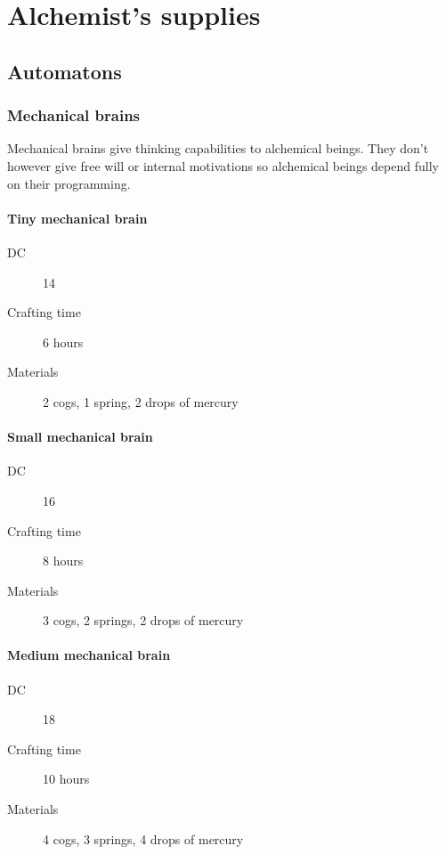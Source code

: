 \chapter{Alchemist's supplies}

\section{Automatons}

\subsection{Mechanical brains}

Mechanical brains give thinking capabilities to alchemical beings. They don't however give free will or internal motivations so alchemical beings
depend fully on their programming.

\subsubsection{Tiny mechanical brain}

\begin{description}
\item [DC] 14 \arcana
\item [Crafting time] 6 hours
\item [Materials] 2 cogs, 1 spring, 2 drops of mercury
\end{description}

\subsubsection{Small mechanical brain}

\begin{description}
\item [DC] 16 \arcana
\item [Crafting time] 8 hours
\item [Materials] 3 cogs, 2 springs, 2 drops of mercury
\end{description}

\subsubsection{Medium mechanical brain}

\begin{description}
\item [DC] 18 \arcana
\item [Crafting time] 10 hours
\item [Materials] 4 cogs, 3 springs, 4 drops of mercury
\end{description}

